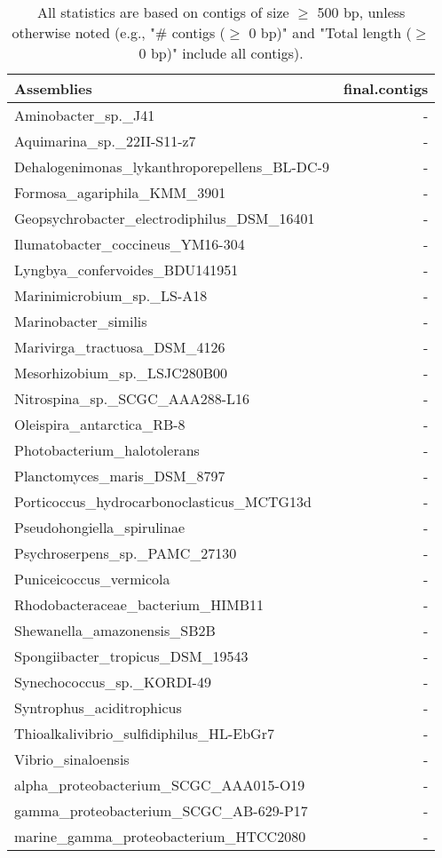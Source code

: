 \documentclass[12pt,a4paper]{article}
\begin{document}
\begin{table}[ht]
\begin{center}
\caption{All statistics are based on contigs of size $\geq$ 500 bp, unless otherwise noted (e.g., "\# contigs ($\geq$ 0 bp)" and "Total length ($\geq$ 0 bp)" include all contigs).}
\begin{tabular}{|l*{1}{|r}|}
\hline
Assemblies & final.contigs \\ \hline
Aminobacter\_sp.\_J41 & - \\ \hline
Aquimarina\_sp.\_22II-S11-z7 & - \\ \hline
Dehalogenimonas\_lykanthroporepellens\_BL-DC-9 & - \\ \hline
Formosa\_agariphila\_KMM\_3901 & - \\ \hline
Geopsychrobacter\_electrodiphilus\_DSM\_16401 & - \\ \hline
Ilumatobacter\_coccineus\_YM16-304 & - \\ \hline
Lyngbya\_confervoides\_BDU141951 & - \\ \hline
Marinimicrobium\_sp.\_LS-A18 & - \\ \hline
Marinobacter\_similis & - \\ \hline
Marivirga\_tractuosa\_DSM\_4126 & - \\ \hline
Mesorhizobium\_sp.\_LSJC280B00 & - \\ \hline
Nitrospina\_sp.\_SCGC\_AAA288-L16 & - \\ \hline
Oleispira\_antarctica\_RB-8 & - \\ \hline
Photobacterium\_halotolerans & - \\ \hline
Planctomyces\_maris\_DSM\_8797 & - \\ \hline
Porticoccus\_hydrocarbonoclasticus\_MCTG13d & - \\ \hline
Pseudohongiella\_spirulinae & - \\ \hline
Psychroserpens\_sp.\_PAMC\_27130 & - \\ \hline
Puniceicoccus\_vermicola & - \\ \hline
Rhodobacteraceae\_bacterium\_HIMB11 & - \\ \hline
Shewanella\_amazonensis\_SB2B & - \\ \hline
Spongiibacter\_tropicus\_DSM\_19543 & - \\ \hline
Synechococcus\_sp.\_KORDI-49 & - \\ \hline
Syntrophus\_aciditrophicus & - \\ \hline
Thioalkalivibrio\_sulfidiphilus\_HL-EbGr7 & - \\ \hline
Vibrio\_sinaloensis & - \\ \hline
alpha\_proteobacterium\_SCGC\_AAA015-O19 & - \\ \hline
gamma\_proteobacterium\_SCGC\_AB-629-P17 & - \\ \hline
marine\_gamma\_proteobacterium\_HTCC2080 & - \\ \hline
\end{tabular}
\end{center}
\end{table}
\end{document}
